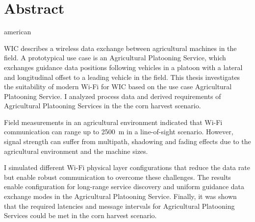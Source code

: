 \chapter*{Abstract}
\begin{otherlanguage*}{american}

\begin{comment}
    about 1/2 page:
\begin{enumerate}
    \item Motivation (Why do we care?)
    \item Problem statement (What problem are we trying to solve?)
    \item Approach (How did we go about it)
    \item Results (What's the answer?)
    \item Conclusion (What are the implications of the answer?)
\end{enumerate}

The abstract is a miniature version of the thesis.
It should be treated as an entirely separate document.
Do not assume that a reader who has access to an abstract will also have access to the thesis.
Do not assume that a reader who reads the thesis has read the abstract.

\end{comment}

\ac{WIC} describes a wireless data exchange between agricultural machines in the field.
A prototypical use case is an Agricultural Platooning Service, which exchanges guidance data positions following
vehicles in a platoon with a lateral and longitudinal offset to a leading vehicle in the field.
This thesis investigates the suitability of modern Wi-Fi for \ac{WIC} based on the use case Agricultural Platooning Service.
I analyzed process data and derived requirements of Agricultural Platooning Services in the the corn harvest scenario.

Field measurements in an agricultural environment indicated that Wi-Fi communication can range up to \SI{2500}{\metre} in
a line-of-sight scenario.
However, signal strength can suffer from multipath, shadowing and fading effects due to the
agricultural environment and the machine sizes.


I simulated different Wi-Fi physical layer configurations that reduce the data rate but
enable robust communication to overcome these challenges.
The results enable configuration for long-range service discovery and uniform guidance data exchange modes
in the Agricultural Platooning Service.
Finally, it was shown that the required latencies and message intervals for Agricultural Platooning Services could be met in the corn harvest
scenario.

\end{otherlanguage*}

